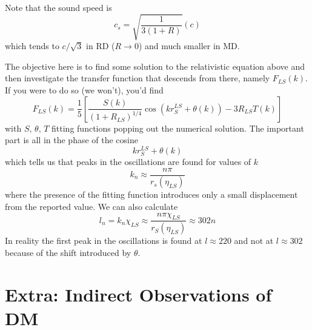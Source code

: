 Note that the sound speed is 
\begin{equation}
    c_{s} = \sqrt{\frac{1}{3(1+R)}}(c)
\end{equation}
which tends to $c/\sqrt{3}$ in RD ($R\to 0$) and much smaller in MD.
\par The objective here is to find some solution to the relativistic equation above and then investigate the transfer function that descends from there, namely $F_{LS}(k)$. If you were to do so (we won't), you'd find 
\begin{equation}
    F_{LS}(k) = \frac{1}{5}\left[\frac{S(k)}{(1+R_{LS})^{1/4}}\cos(kr_{S}^{LS}+\theta(k))-3R_{LS}T(k)\right]
\end{equation}
with $S,\,\theta,\,T$ fitting functions popping out the numerical solution. The important part is all in the phase of the cosine 
\begin{equation}
    kr_{S}^{LS}+\theta(k)
\end{equation}
which tells us that peaks in the oscillations are found for values of $k$
\begin{equation}
    k_{n} \approx \frac{n\pi}{r_{s}(\eta_{LS})}
\end{equation}
where the presence of the fitting function introduces only a small displacement from the reported value. We can also calculate 
\begin{equation}
    l_{n} = k_{n}\chi_{LS} \approx \frac{n\pi\chi_{LS}}{r_{S}(\eta_{LS})} \approx 302n
\end{equation}
In reality the first peak in the oscillations is found at $l\approx 220$ and not at $l \approx 302$ because of the shift introduced by $\theta$.

\section{Extra: Indirect Observations of DM}

